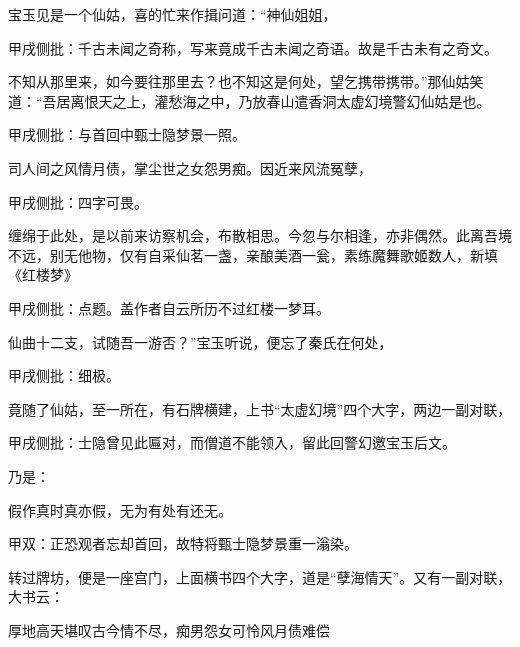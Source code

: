 \begin{parag}
    宝玉见是一个仙姑，喜的忙来作揖问道：“神仙姐姐，\begin{note}甲戌侧批：千古未闻之奇称，写来竟成千古未闻之奇语。故是千古未有之奇文。\end{note}不知从那里来，如今要往那里去？也不知这是何处，望乞携带携带。”那仙姑笑道：“吾居离恨天之上，灌愁海之中，乃放春山遣香洞太虚幻境警幻仙姑是也。\begin{note}甲戌侧批：与首回中甄士隐梦景一照。\end{note}司人间之风情月债，掌尘世之女怨男痴。因近来风流冤孽，\begin{note}甲戌侧批：四字可畏。\end{note}缠绵于此处，是以前来访察机会，布散相思。今忽与尔相逢，亦非偶然。此离吾境不远，别无他物，仅有自采仙茗一盏，亲酿美酒一瓮，素练魔舞歌姬数人，新填《红楼梦》\begin{note}甲戌侧批：点题。盖作者自云所历不过红楼一梦耳。\end{note}仙曲十二支，试随吾一游否？”宝玉听说，便忘了秦氏在何处，\begin{note}甲戌侧批：细极。\end{note}竟随了仙姑，至一所在，有石牌横建，上书“太虚幻境”四个大字，两边一副对联，\begin{note}甲戌侧批：士隐曾见此匾对，而僧道不能领入，留此回警幻邀宝玉后文。\end{note}乃是：
\end{parag}


\begin{poem}
    \begin{pl}假作真时真亦假，无为有处有还无。\end{pl}\begin{note}甲双：正恐观者忘却首回，故特将甄士隐梦景重一滃染。\end{note}
\end{poem}


\begin{parag}
    转过牌坊，便是一座宫门，上面横书四个大字，道是“孽海情天”。又有一副对联，大书云：
\end{parag}


\begin{poem}
    \begin{pl}厚地高天堪叹古今情不尽，痴男怨女可怜风月债难偿\end{pl}
\end{poem}


